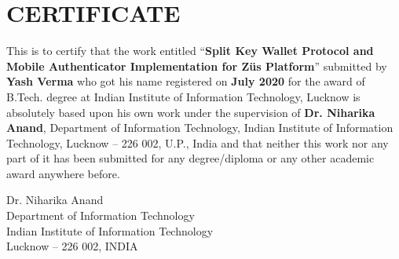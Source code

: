 \chapter*{CERTIFICATE}
This is to certify that the work entitled ``\textbf{Split Key Wallet Protocol and Mobile Authenticator Implementation for Züs Platform}'' submitted by \textbf{Yash Verma} who got his name registered on \textbf{July 2020} for the award of B.Tech.
degree at Indian Institute of Information Technology, Lucknow is absolutely based upon his own work under the supervision of \textbf{Dr. Niharika Anand}, Department of Information Technology, Indian Institute of Information Technology, Lucknow -- 226 002, U.P., India and that neither this work nor any part of it has been submitted for any degree/diploma or any other academic award anywhere before.
\vspace{4cm}
\begin{center}
Dr. Niharika Anand\\
Department of Information Technology\\
Indian Institute of Information Technology\\
Lucknow -- 226 002, INDIA
\end{center}

